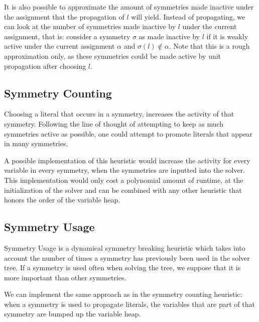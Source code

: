 		It is also possible to approximate the amount of symmetries made inactive under the
		assignment that the propagation of $l$ will yield.
		Instead of propagating, we can look at the number of symmetries made inactive by $l$
		under the current assignment, that is: consider a symmetry $\sigma$ as
		made inactive by $l$ if it is weakly active under the current assignment $\alpha$ and
		$\sigma(l) \notin \alpha$.
		Note that this is a rough approximation only, as these symmetries could be made active by
		unit propagation after choosing $l$.

\subsection{Symmetry Counting}

	Choosing a literal that occurs in a symmetry, increases the activity of that symmetry.
	Following the line of thought of attempting to keep as much symmetries active as possible,
	one could attempt to promote literals that appear in many symmetries.

	A possible implementation of this heuristic would increase the activity for every variable in
	every symmetry, when the symmetries are inputted into the solver.
	This implementation would only cost a polynomial amount of runtime, at the initialization of the
	solver and can be combined with any other heuristic that honors the order of the variable heap.

\subsection{Symmetry Usage}
	Symmetry Usage is a dynamical symmetry breaking heuristic
	which takes into account the number of times a symmetry has previously been used in the solver tree.
	If a symmetry is used often when solving the tree, we suppose that it is more important than other symmetries.

	We can implement the same approach as in the symmetry counting heuristic: when a symmetry is
	used to propagate literals, the variables that are part of that symmetry are bumped up the
	variable heap.



